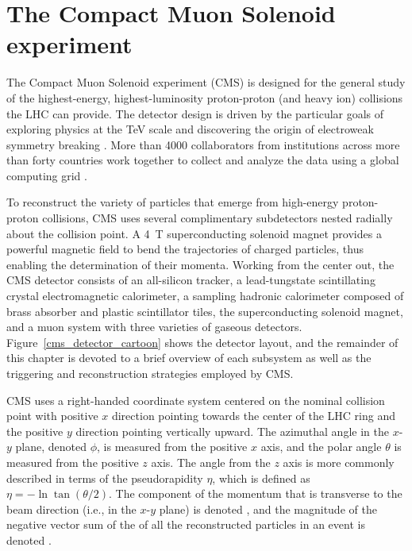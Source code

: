 \section{The Compact Muon Solenoid experiment}
\label{cms}
The Compact Muon Solenoid experiment (CMS) is designed for the general study of the highest-energy, highest-luminosity proton-proton (and heavy ion) collisions the LHC can provide. The detector design is driven by the particular goals of exploring physics at the \si{\TeV} scale and discovering the origin of electroweak symmetry breaking \cite{cms_tdr_v2}. More than 4000 collaborators from institutions across more than forty countries work together to collect and analyze the data using a global computing grid \cite{cms_collaboration}.

To reconstruct the variety of particles that emerge from high-energy proton-proton collisions, CMS uses several complimentary subdetectors nested radially about the collision point. A \SI{4}{\tesla} superconducting solenoid magnet provides a powerful magnetic field to bend the trajectories of charged particles, thus enabling the determination of their momenta. Working from the center out, the CMS detector consists of an all-silicon tracker, a lead-tungstate scintillating crystal electromagnetic calorimeter, a sampling hadronic calorimeter composed of brass absorber and plastic scintillator tiles, the superconducting solenoid magnet, and a muon system with three varieties of gaseous detectors. Figure~\ref{cms_detector_cartoon} shows the detector layout, and the remainder of this chapter is devoted to a brief overview of each subsystem as well as the triggering and reconstruction strategies employed by CMS.



CMS uses a right-handed coordinate system centered on the nominal collision point with positive $x$ direction pointing towards the center of the LHC ring and the positive $y$ direction pointing vertically upward. The azimuthal angle in the $x$-$y$ plane, denoted $\phi$, is measured from the positive $x$ axis, and the polar angle $\theta$ is measured from the positive $z$ axis. The angle from the $z$ axis is more commonly described in terms of the pseudorapidity $\eta$, which is defined as $\eta=-\ln\tan(\theta/2)$. The component of the momentum that is transverse to the beam direction (i.e., in the $x$-$y$ plane) is denoted \pt, and the magnitude of the negative vector sum of the \pt of all the reconstructed particles in an event is denoted \ptmiss \cite{cms_tdr_v1, cms_experiment}. 

